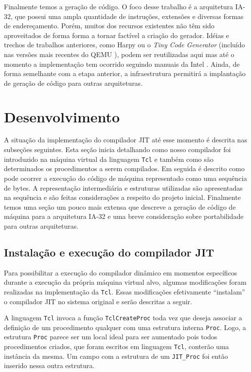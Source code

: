 Finalmente temos a geração de código. O foco desse trabalho é a
arquitetura IA-32, que possui uma ampla quantidade de instruções, extensões e
diversas formas de endereçamento.
Porém, muitos dos recursos existentes não têm sido aproveitados de forma
forma a tornar factível a criação do gerador.
Idéias e trechos de trabalhos anteriores, como Harpy \cite{harpy}
ou o \textit{Tiny Code Generator} (incluído nas versões mais recentes do
QEMU \cite{qemu}), podem ser reutilizadas aqui mas até o momento a
implementação tem ocorrido seguindo manuais da Intel
\cite{intel_aam}\cite{intel_naz}. Ainda, de forma semelhante com a
etapa anterior, a infraestrutura permitirá a implantação de geração de
código para outras arquiteturas.


\section{Desenvolvimento}
\label{desenvolvimento}

A situação da implementação do compilador JIT até esse momento é descrita nas
subseções seguintes. Esta seção inicia detalhando como nosso
compilador foi introduzido na máquina virtual da linguagem \texttt{Tcl} e
também como são determinados os procedimentos a serem compilados. Em
seguida é descrito como pode ocorrer a execução do código de máquina
representado como uma sequência de bytes. A representação
intermediária e estruturas utilizadas são apresentadas na sequência e
são feitas considerações a respeito do projeto inicial. Finalmente
temos uma seção um pouco mais extensa que descreve a geração de código
de máquina para a arquitetura IA-32 e uma breve consideração sobre
portabilidade para outras arquiteturas.


\subsection{Instalação e execução do compilador JIT}
\label{install-exec}
Para possibilitar a execução do compilador dinâmico em momentos
específicos durante a execução da própria máquina virtual alvo, algumas
modificações foram realizadas na implementação da
\texttt{Tcl}. Essas modificações efetivamente ``instalam'' o
compilador JIT no sistema original e serão descritas a seguir.

A linguagem \texttt{Tcl} invoca a função \verb!TclCreateProc! toda vez
que deseja associar a definição de um procedimento qualquer com uma
estrutura interna \verb!Proc!. Logo, a estrutura \verb!Proc! parece
ser um local ideal para ser aumentado pois todos procedimentos
criados, que foram escritos em linguagem \texttt{Tcl}, conterão uma
instância da mesma. Um campo com a estrutura de um
\verb!JIT_Proc! foi então inserido nessa outra estrutura.

